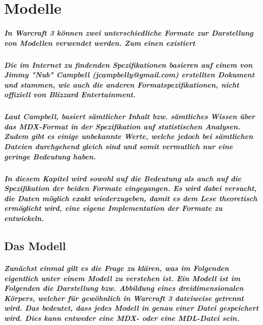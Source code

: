 \chapter { Modelle }
\paragraph { In Warcraft 3 können zwei unterschiedliche Formate zur Darstellung von Modellen verwendet werden. Zum einen existiert }
\paragraph { Die im Internet zu findenden Spezifikationen basieren auf einem von Jimmy "Nub" Campbell (jcampbelly@gmail.com) erstellten Dokument und stammen, wie auch die anderen Formatspezifikationen, nicht offiziell von Blizzard Entertainment. }
\paragraph { Laut Campbell, basiert sämtlicher Inhalt bzw. sämtliches Wissen über das MDX-Format in der Spezifikation auf statistischen Analysen. Zudem gibt es einige unbekannte Werte, welche jedoch bei sämtlichen Dateien durchgehend gleich sind und somit vermutlich nur eine geringe Bedeutung haben. }
\paragraph { In diesem Kapitel wird sowohl auf die Bedeutung als auch auf die Spezifikation der beiden Formate eingegangen. Es wird dabei versucht, die Daten möglich exakt wiederzugeben, damit es dem Lese theoretisch ermöglicht wird, eine eigene Implementation der Formate zu entwickeln. }
\section { Das Modell }
\paragraph { Zunächst einmal gilt es die Frage zu klären, was im Folgenden eigentlich unter einem Modell zu verstehen ist. Ein Modell ist im Folgenden die Darstellung  bzw. Abbildung eines dreidimensionalen Körpers, welcher für gewöhnlich in Warcraft 3 dateiweise getrennt wird. Das bedeutet, dass jedes Modell in genau einer Datei gespeichert wird. Dies kann entweder eine MDX- oder eine MDL-Datei sein. }



